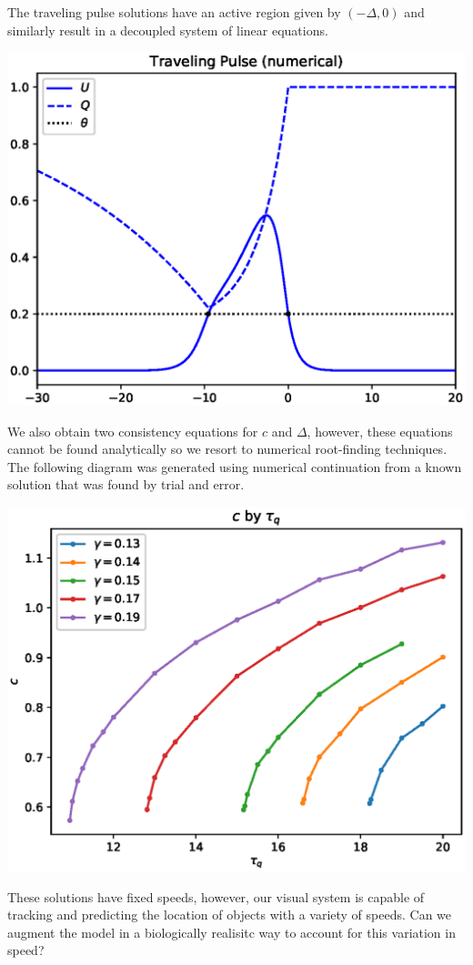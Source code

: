 \documentclass[landscape,final]{baposter}
\begin{document}
\begin{poster}
{
	The traveling pulse solutions have an active region given by $(-\Delta, 0)$ and similarly result in a decoupled system of linear equations.
	\begin{center}
		\includegraphics[width=.45\linewidth]{pulse_profile}
	\end{center}
	We also obtain two consistency equations for $c$ and $\Delta$, however, these equations cannot be found analytically so we resort to numerical root-finding techniques. The following diagram was generated using numerical continuation from a known solution that was found by trial and error.
	\begin{center}
		\includegraphics[width=.45\linewidth]{pulse_bifurcation}
	\end{center}
}

{
	These solutions have fixed speeds, however, our visual system is capable of tracking and predicting the location of objects with a variety of speeds. Can we augment the model in a biologically realisitc way to account for this variation in speed?
	\bigbreak
	
}
\end{poster}
\end{document}
